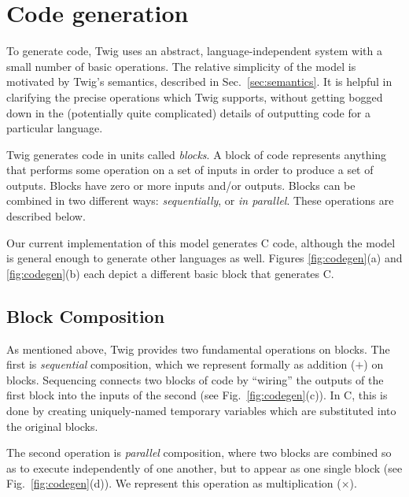 
\section{Code generation}
\label{sec:code-gen}

To generate code, Twig uses an abstract, language-independent system with a small number of basic operations. The relative simplicity of the model is motivated by Twig's semantics, described in Sec.~\ref{sec:semantics}. It is helpful in clarifying the precise operations which Twig supports, without getting bogged down in the (potentially quite complicated) details of outputting code for a particular language.

Twig generates code in units called \emph{blocks}. A block of code represents anything that performs some operation on a set of inputs in order to produce a set of outputs. Blocks have zero or more inputs and/or outputs. Blocks can be combined in two different ways: \emph{sequentially}, or \emph{in parallel}. These operations are described below.

Our current implementation of this model generates C code, although the model is general enough to generate other languages as well. Figures \ref{fig:codegen}(a) and \ref{fig:codegen}(b) each depict a different basic block that generates C.

\subsection{Block Composition}

As mentioned above, Twig provides two fundamental operations on blocks. The first is \emph{sequential} composition, which we represent formally as addition ($+$) on blocks. Sequencing connects two blocks of code by ``wiring'' the outputs of the first block into the inputs of the second (see Fig.~\ref{fig:codegen}(c)). In C, this is done by creating uniquely-named temporary variables which are substituted into the original blocks.

The second operation is \emph{parallel} composition, where two blocks are combined so as to execute independently of one another, but to appear as one single block (see Fig.~\ref{fig:codegen}(d)). We represent this operation as multiplication ($\times$).

